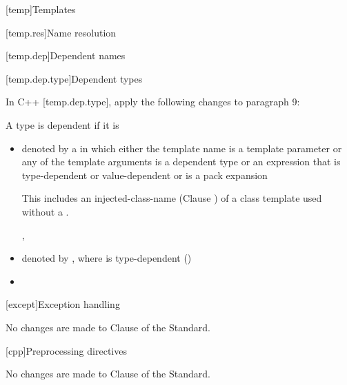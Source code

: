 
[temp]{Templates}

\setcounter{section}{6}
[temp.res]{Name resolution}

\setcounter{subsection}{1}
[temp.dep]{Dependent names}

[temp.dep.type]{Dependent types}

\pnum
In C++ [temp.dep.type], apply the following changes to paragraph 9:

\setcounter{Paras}{9}
\setcounter{Bullets1}{7}

\begin{std.txt}

A type is dependent if it is \newline
[...]

\begin{itemize}
  \item denoted by a  in which either the template name is a template parameter or any of
the template arguments is a dependent type or an expression that is type-dependent or value-dependent
or is a pack expansion \begin{note} This includes an injected-class-name (Clause
) of a class template used
without a . \end{note}, 


  \item denoted by \tcode{)}, where
         is type-dependent ()
  \item {}
\end{itemize}
\end{std.txt}

[except]{Exception handling}

No changes are made to Clause \the\value{chapter} of the \Cpp Standard.

[cpp]{Preprocessing directives}

No changes are made to Clause \the\value{chapter} of the \Cpp Standard.
